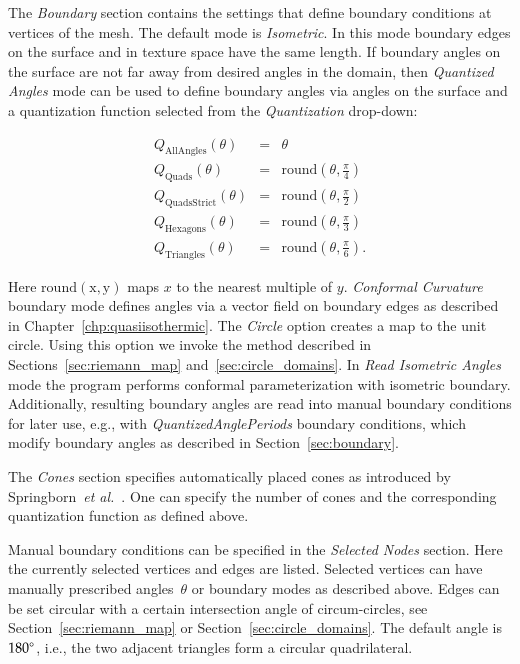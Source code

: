 \documentclass[Thesis.tex]{subfiles}
\begin{document}
The \emph{Boundary} section contains the settings that define boundary conditions at vertices of the mesh. 
The default mode is \emph{Isometric}. In this mode boundary edges on the surface and in texture space have the same length. If boundary angles on the surface are not far away from desired angles in the domain, then \emph{Quantized Angles} mode can be used to define boundary angles via angles on the surface and a quantization function selected from the \emph{Quantization} drop-down:

\begin{eqnarray*}
	Q_{\mathrm{AllAngles}}(\theta) &=& \theta \\
	Q_{\mathrm{Quads}}(\theta) &=& \mathrm{round}\left(\theta, \frac{\pi}{4}\right) \\
	Q_{\mathrm{QuadsStrict}}(\theta) &=& \mathrm{round}\left(\theta, \frac{\pi}{2}\right) \\
	Q_{\mathrm{Hexagons}}(\theta) &=& \mathrm{round}\left(\theta, \frac{\pi}{3}\right) \\
	Q_{\mathrm{Triangles}}(\theta) &=& \mathrm{round}\left(\theta, \frac{\pi}{6}\right).
\end{eqnarray*}

Here $\mathrm{round(x,y)}$ maps $x$ to the nearest multiple of $y$.
\emph{Conformal Curvature} boundary mode defines angles via a vector field on boundary edges as described in Chapter~\ref{chp:quasiisothermic}. 
The \emph{Circle} option creates a map to the unit circle. 
Using this option we invoke the method described in Sections~\ref{sec:riemann_map} and~\ref{sec:circle_domains}. 
In \emph{Read Isometric Angles} mode the program performs conformal parameterization with isometric boundary. 
Additionally, resulting boundary angles are read into manual boundary conditions for later use, e.g., with \emph{QuantizedAnglePeriods} boundary conditions, which modify boundary angles as described in Section~\ref{sec:boundary}.

The \emph{Cones} section specifies automatically placed cones as introduced by Springborn~\emph{et al.}\ \cite{Springborn2008}. 
One can specify the number of cones and the corresponding quantization function as defined above.

Manual boundary conditions can be specified in the \emph{Selected Nodes} section. 
Here the currently selected vertices and edges are listed. 
Selected vertices can have manually prescribed angles~$\theta$ or boundary modes as described above. 
Edges can be set circular with a certain intersection angle of circum-circles, see Section~\ref{sec:riemann_map} or Section~\ref{sec:circle_domains}. 
The default angle is $180\degree$, i.e., the two adjacent triangles form a circular quadrilateral.
\end{document}
